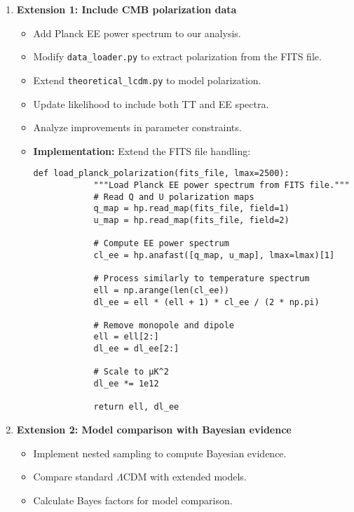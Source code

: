 \documentclass[11pt]{article}
\begin{document}
\begin{enumerate}
    \item \textbf{Extension 1: Include CMB polarization data}
    \begin{itemize}
        \item Add Planck EE power spectrum to our analysis.
        \item Modify \texttt{data\_loader.py} to extract polarization from the FITS file.
        \item Extend \texttt{theoretical\_lcdm.py} to model polarization.
        \item Update likelihood to include both TT and EE spectra.
        \item Analyze improvements in parameter constraints.
        
        \item \textbf{Implementation:} Extend the FITS file handling:
        \begin{lstlisting}[basicstyle=\small\ttfamily]
        def load_planck_polarization(fits_file, lmax=2500):
            """Load Planck EE power spectrum from FITS file."""
            # Read Q and U polarization maps
            q_map = hp.read_map(fits_file, field=1)
            u_map = hp.read_map(fits_file, field=2)
            
            # Compute EE power spectrum
            cl_ee = hp.anafast([q_map, u_map], lmax=lmax)[1]
            
            # Process similarly to temperature spectrum
            ell = np.arange(len(cl_ee))
            dl_ee = ell * (ell + 1) * cl_ee / (2 * np.pi)
            
            # Remove monopole and dipole
            ell = ell[2:]
            dl_ee = dl_ee[2:]
            
            # Scale to μK^2
            dl_ee *= 1e12
            
            return ell, dl_ee
        \end{lstlisting}
    \end{itemize}
    
    \item \textbf{Extension 2: Model comparison with Bayesian evidence}
    \begin{itemize}
        \item Implement nested sampling to compute Bayesian evidence.
        \item Compare standard $\Lambda$CDM with extended models.
        \item Calculate Bayes factors for model comparison.
        

\end{itemize}
\end{enumerate}
\end{document}
